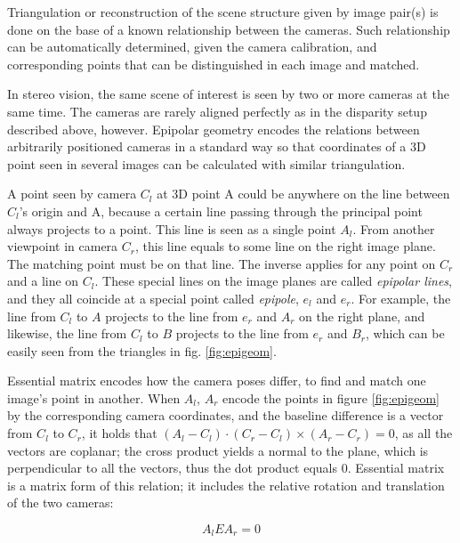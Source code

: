 
Triangulation or reconstruction of the scene structure given by image pair(s) is done on the base of a known relationship between the cameras.
Such relationship can be automatically determined, given the camera calibration, and corresponding points that can be distinguished in each image and matched.
\cite{trucco1998introductory,hartley03multiview}

In stereo vision, the same scene of interest is seen by two or more cameras at the same time.
The cameras are rarely aligned perfectly as in the disparity setup described above, however.
Epipolar geometry encodes the relations between arbitrarily positioned cameras in a standard way so that coordinates of a 3D point seen in several images can be calculated with similar triangulation.

A point seen by camera $C_l$ at 3D point A could be anywhere on the line between $C_l$'s origin and A, because a certain line passing through the principal point always projects to a point.
This line is seen as a single point $A_l$.
From another viewpoint in camera $C_r$, this line equals to some line on the right image plane.
The matching point must be on that line.
The inverse applies for any point on $C_r$ and a line on $C_l$.
These special lines on the image planes are called \emph{epipolar lines}, and they all coincide at a special point called \emph{epipole}, $e_l$ and $e_r$.
For example, the line from $C_l$ to $A$ projects to the line from $e_r$ and $A_r$ on the right plane, and likewise, the line from $C_l$ to $B$ projects to the line from $e_r$ and $B_r$, which can be easily seen from the triangles in fig. \ref{fig:epigeom}.

Essential matrix encodes how the camera poses differ, to find and match one image's point in another.
When $A_l$, $A_r$ encode the points in figure \ref{fig:epigeom} by the corresponding camera coordinates, and the baseline difference is a vector from $C_l$ to $C_r$, it holds that $(A_l-C_l) \cdot (C_r - C_l) \times (A_r-C_r) = 0$, as all the vectors are coplanar; the cross product yields a normal to the plane, which is perpendicular to all the vectors, thus the dot product equals 0.
\cite{hartley03multiview}
Essential matrix is a matrix form of this relation; it includes the relative rotation and translation of the two cameras:

\begin{equation} \label{eq:essential}
	A_l E A_r = 0
\end{equation}

